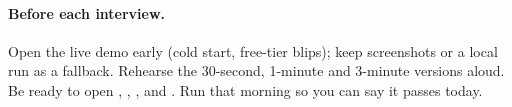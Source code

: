 \paragraph{Before each interview.} Open the live demo early (cold start, free-tier blips); keep screenshots or a local run as a fallback. Rehearse the 30-second, 1-minute and 3-minute versions aloud. Be ready to open , , ,  and . Run  that morning so you can say it passes today.
